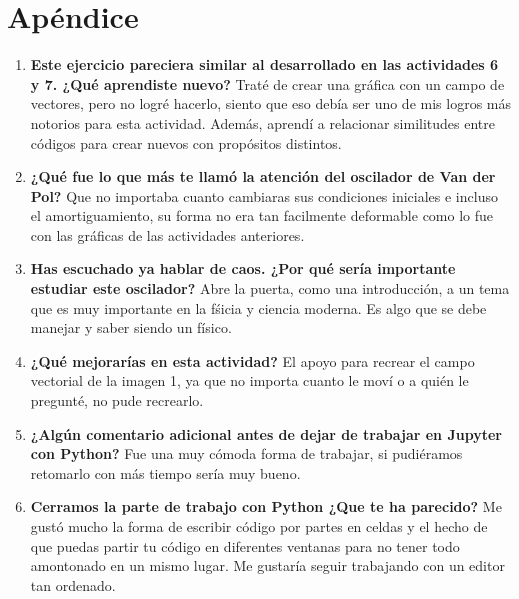 \documentclass{article}
\begin{document}
\section{Apéndice}
\begin{enumerate}
\item \textbf{Este ejercicio pareciera similar al desarrollado en las actividades 6 y 7. ¿Qué aprendiste nuevo?} Traté de crear una gráfica con un campo de vectores, pero no logré hacerlo, siento que eso debía ser uno de mis logros más notorios para esta actividad. Además, aprendí a relacionar similitudes entre códigos para crear nuevos con propósitos distintos.

\item\textbf{¿Qué fue lo que más te llamó la atención del oscilador de Van der Pol?} Que no importaba cuanto cambiaras sus condiciones iniciales e incluso el amortiguamiento, su forma no era tan facilmente deformable como lo fue con las gráficas de las actividades anteriores.

\item\textbf{Has escuchado ya hablar de caos. ¿Por qué sería importante estudiar este oscilador?} Abre la puerta, como una introducción, a un tema que es muy importante en la fśicia y ciencia moderna. Es algo que se debe manejar y saber siendo un físico.

\item\textbf{¿Qué mejorarías en esta actividad?} El apoyo para recrear el campo vectorial de la imagen 1, ya que no importa cuanto le moví o a quién le pregunté, no pude recrearlo.

\item\textbf{¿Algún comentario adicional antes de dejar de trabajar en Jupyter con Python?} Fue una muy cómoda forma de trabajar, si pudiéramos retomarlo con más tiempo sería muy bueno.

\item\textbf{Cerramos la parte de trabajo con Python ¿Que te ha parecido?} Me gustó mucho la forma de escribir código por partes en celdas y el hecho de que puedas partir tu código en diferentes ventanas para no tener todo amontonado en un mismo lugar. Me gustaría seguir trabajando con un editor tan ordenado.

\end{enumerate}
\end{document}
